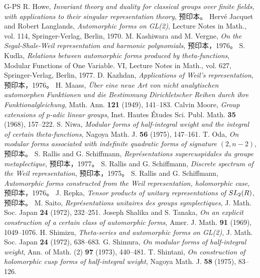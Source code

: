 \begin{thebibliography}{G-PS}
 R. Howe, \emph{Invariant theory and duality for classical groups over finite fields, with applications to their singular representation theory}, 预印本。
 Hervé Jacquet and Robert Langlands, \emph{Automorphic forms on GL(2)}, Lecture Notes in Math., vol. 114, Springer-Verlag, Berlin, 1970.
 M. Kashiwara and M. Vergne, \emph{On the Segal-Shale-Weil representation and harmonic polynomials}, 预印本，1976。
 S. Kudla, \emph{Relations between automorphic forms produced by theta-functions}, Modular Functions of One Variable. VI, Lecture Notes in Math., vol. 627, Springer-Verlag, Berlin, 1977.
 D. Kazhdan, \emph{Applications of Weil's representation}, 预印本，1976。
 H. Maass, \emph{Über eine neue Art von nicht analytischen automorphen Funktionen und die Bestimmung Dirichletscher Reihen durch ihre Funktionalgleichung}, Math. Ann. \textbf{121} (1949), 141--183.
 Calvin Moore, \emph{Group extensions of $p$-adic linear groups}, Inst. Hautes Études Sci. Publ. Math. \textbf{35} (1968), 157--222.
 S. Niwa, \emph{Modular forms of half-integral weight and the integral of certain theta-functions}, Nagoya Math. J. \textbf{56} (1975), 147--161.
 T. Oda, \emph{On modular forms associated with indefinite quadratic forms of signature $(2,n-2)$}, 预印本。
 S. Rallis and G. Schiffmann, \emph{Représentations supercuspidales du groupe metaplectique}, 预印本，1977。
 S. Rallis and G. Schiffmann, \emph{Discrete spectrum of the Weil representation}, 预印本，1975。
 S. Rallis and G. Schiffmann, \emph{Automorphic forms constructed from the Weil representation, holomorphic case}, 预印本，1976。
 J. Repka, \emph{Tensor products of unitary representations of $SL_2(R)$}, 预印本。
 M. Saito, \emph{Représentations unitaires des groups symplectiques}, J. Math. Soc. Japan \textbf{24} (1972), 232--251.
 Joseph Shalika and S. Tanaka, \emph{On an explicit construction of a certain class of automorphic forms}, Amer. J. Math. \textbf{91} (1969), 1049--1076.
 H. Shimizu, \emph{Theta-series and automorphic forms on GL(2)}, J. Math. Soc. Japan \textbf{24} (1972), 638--683.
 G. Shimura, \emph{On modular forms of half-integral weight}, Ann. of Math. (2) \textbf{97} (1973), 440--481.
 T. Shintani, \emph{On construction of holomorphic cusp forms of half-integral weight}, Nagoya Math. J. \textbf{58} (1975), 83--126.

\end{thebibliography}
